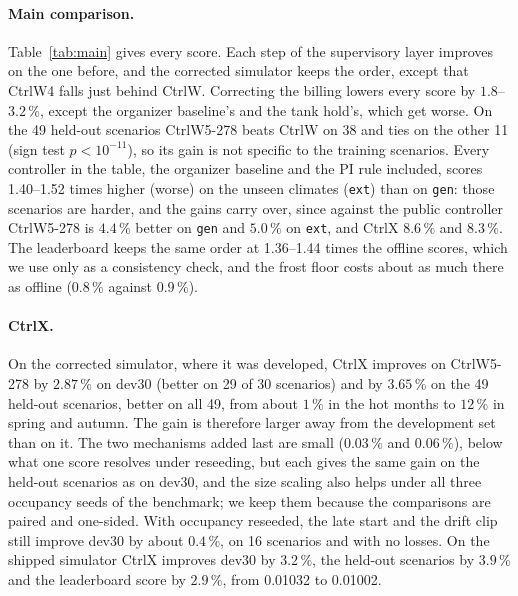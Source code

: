 \documentclass{article}
\newcommand{\cn}[1]{\texttt{#1}}
\begin{document}
\paragraph{Main comparison.} Table~\ref{tab:main} gives every score. Each step of the
supervisory layer improves on the one before, and the corrected simulator keeps the order,
except that CtrlW4 falls just behind CtrlW. Correcting the billing lowers every score by
$1.8$--$3.2\,\%$, except the organizer baseline's and the tank hold's, which get worse. On the
49 held-out scenarios CtrlW5-278 beats CtrlW on 38 and ties on the other 11 (sign test
$p<10^{-11}$), so its gain is not specific to the training scenarios. Every controller in the
table, the organizer baseline and the PI rule included, scores 1.40--1.52 times higher (worse) on
the unseen climates (\cn{ext}) than on \cn{gen}: those scenarios are harder, and the gains carry
over, since against the public controller CtrlW5-278 is $4.4\,\%$ better on \cn{gen} and
$5.0\,\%$ on \cn{ext}, and CtrlX $8.6\,\%$ and $8.3\,\%$. The leaderboard keeps the same order at
1.36--1.44 times the offline scores,
which we use only as a consistency check, and the frost floor costs about as much there as
offline ($0.8\,\%$ against $0.9\,\%$).

\paragraph{CtrlX.} On the corrected simulator, where it was developed, CtrlX improves on
CtrlW5-278 by $2.87\,\%$ on dev30 (better on 29 of 30 scenarios) and by $3.65\,\%$ on the 49
held-out scenarios, better on all 49, from about $1\,\%$ in the hot months to $12\,\%$ in spring
and autumn. The gain is therefore larger away from the development set than on it. The two
mechanisms added last are small ($0.03\,\%$ and $0.06\,\%$), below what one score resolves under
reseeding, but each gives the same gain on the held-out scenarios as on dev30, and the size
scaling also helps under all three occupancy seeds of the benchmark; we keep them because the
comparisons are paired and one-sided. With occupancy reseeded, the late start and the drift clip
still improve dev30 by about $0.4\,\%$, on 16 scenarios and with no losses. On the shipped
simulator CtrlX improves dev30 by $3.2\,\%$, the held-out scenarios by $3.9\,\%$ and the
leaderboard score by $2.9\,\%$, from 0.01032 to 0.01002.
\end{document}
